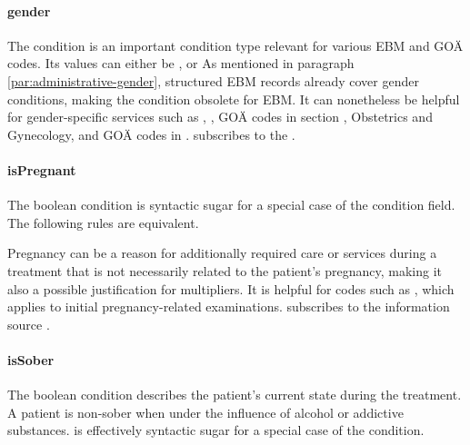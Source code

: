 \paragraph{gender}
The \gender condition is an important condition type relevant for various EBM and GOÄ codes.
Its values can either be ,  or 
As mentioned in paragraph \ref{par:administrative-gender}, structured EBM records already cover gender conditions, making the \gender condition obsolete for EBM.
It can nonetheless be helpful for gender-specific services such as  , ,  GOÄ codes in section , Obstetrics and Gynecology, and GOÄ codes in .
\gender subscribes to the .
\paragraph{isPregnant}
The \isPregnant boolean condition is syntactic sugar for a special case of the \anamnesisBlocks condition field.
The following rules are equivalent.

Pregnancy can be a reason for additionally required care or services during a treatment that is not necessarily related to the patient's pregnancy,
making it also a possible justification for multipliers.
It is helpful for codes such as , which applies to initial pregnancy-related examinations.
 subscribes to the information source .

\paragraph{isSober}
The \isSober boolean condition describes the patient's current state during the treatment.
A patient is non-sober when under the influence of alcohol or addictive substances.
\isSober is effectively syntactic sugar for a special case of the \anamnesisBlocks condition.



